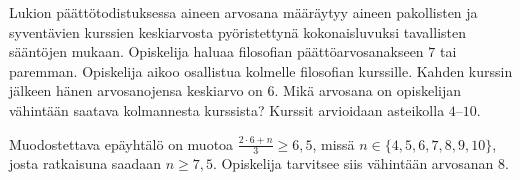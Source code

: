 \begin{tehtavasivu}
\begin{tehtava}
Lukion päättötodistuksessa aineen arvosana määräytyy aineen pakollisten ja syventävien kurssien keskiarvosta pyöristettynä kokonaisluvuksi tavallisten sääntöjen mukaan. Opiskelija haluaa filosofian päättöarvosanakseen $7$ tai paremman. Opiskelija aikoo osallistua kolmelle filosofian kurssille. Kahden kurssin jälkeen hänen arvosanojensa keskiarvo on $6$. Mikä arvosana on opiskelijan vähintään saatava kolmannesta kurssista? Kurssit arvioidaan asteikolla 
$4$--$10$.
\begin{vastaus}
Muodostettava epäyhtälö on muotoa $\frac{2\cdot 6+n}{3}\geq 6,5$, missä $n \in \lbrace 4,5,6,7,8,9,10 \rbrace$, josta ratkaisuna saadaan $n\geq 7,5$. Opiskelija tarvitsee siis vähintään arvosanan $8$.
\end{vastaus}
\end{tehtava}

\end{tehtavasivu}